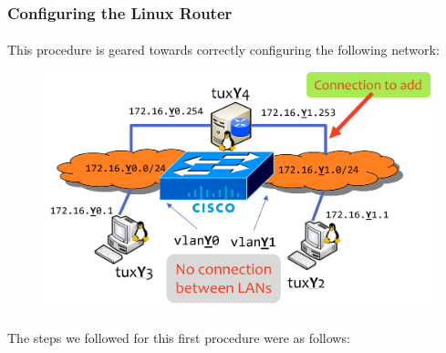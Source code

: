 \documentclass[11pt]{article}
\begin{document}
\subsubsection*{Configuring the Linux Router}

\paragraph{}This procedure is geared towards correctly configuring the following network:

\begin{figure}[h]
    \includegraphics[scale=1]{images/net-exp4-1.png}
    \centering
\end{figure}

\paragraph{}The steps we followed for this first procedure were as follows:
\end{document}
